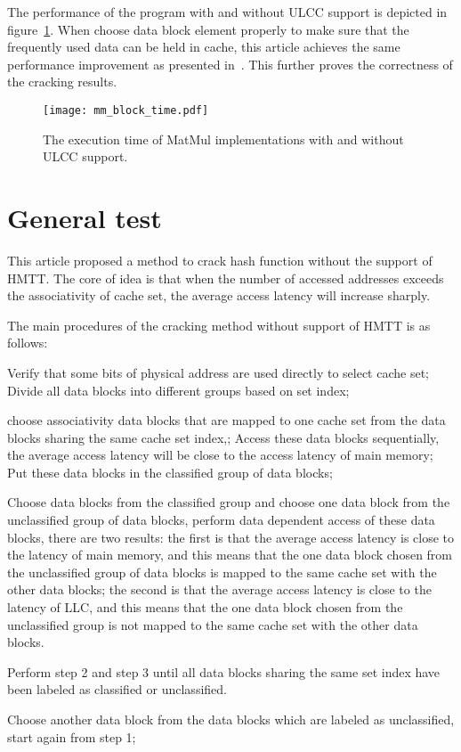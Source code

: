 \documentclass[conference]{IEEEtran}
\newcommand{\Associativity}{associativity }
\begin{document}
The performance of the program with and without ULCC support is depicted in figure~\ref{fig:MMBlockTime}. When choose data block element properly to make sure that the frequently used data can be held in cache, this article achieves the same performance improvement as presented in~\cite{ding2011ulcc}. This further proves the correctness of the cracking results.
\begin{figure}[!htp]
\centering
\texttt{[image: mm\_block\_time.pdf]}
\caption{The execution time of MatMul implementations with and without ULCC support.}
\label{fig:MMBlockTime}
\end{figure}
\section{General test}
This article proposed a method to crack hash function without the support of HMTT. The core of idea is that when the number of accessed addresses exceeds the associativity of cache set, the average access latency will increase sharply.

The main procedures of the cracking method without support of HMTT is as follows:
\begin{inparaenum}[(1)]
\item Verify that some bits of physical address are used directly to select cache set; Divide all data blocks into different groups based on set index;
\item  choose \Associativity data blocks that are mapped to one cache set from the data blocks sharing the same cache set index,; Access these data blocks sequentially, the average access latency will be close to the access latency of main memory; Put these data blocks in the classified group of data blocks;
\item Choose  data blocks from the classified group and choose one data block from the unclassified group of data blocks, perform data dependent access of these data blocks, there are two results: the first is that the average access latency is close to the latency of main memory, and this means that the one data block chosen from the unclassified group of data blocks is mapped to the same cache set with the other  data blocks; the second is that the average access latency is close to the latency of LLC, and this means that the one data block chosen from the unclassified group is not mapped to the same cache set with the other  data blocks.
\item Perform step 2 and step 3 until all data blocks sharing the same set index have been labeled as classified or unclassified.
\item Choose another data block from the data blocks which are labeled as unclassified, start again from step 1;	
\end{inparaenum}
\end{document}

